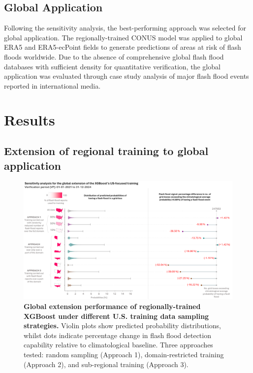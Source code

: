 \subsection{Global Application}
Following the sensitivity analysis, the best-performing approach was selected for global application. The regionally-trained CONUS model was applied to global ERA5 and ERA5-ecPoint fields to generate predictions of areas at risk of flash floods worldwide. Due to the absence of comprehensive global flash flood databases with sufficient density for quantitative verification, the global application was evaluated through case study analysis of major flash flood events reported in international media.


\section{Results}

\subsection{Extension of regional training to global application}

\begin{figure}[htbp]
\centering
\includegraphics[width=\textwidth]{sensitivity_analysis_global_extension.png}
\caption{\textbf{Global extension performance of regionally-trained XGBoost under different U.S. training data sampling strategies.} Violin plots show predicted probability distributions, whilst dots indicate percentage change in flash flood detection capability relative to climatological baseline. Three approaches tested: random sampling (Approach 1), domain-restricted training (Approach 2), and sub-regional training (Approach 3).}
\label{fig:sensitivity_analysis_global_extension}
\end{figure}

